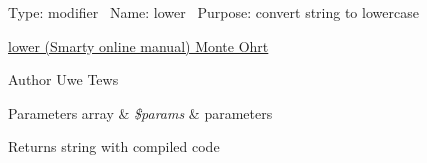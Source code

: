 Type\+: modifier~\newline
 Name\+: lower~\newline
 Purpose\+: convert string to lowercase

\hyperlink{}{lower (Smarty online manual)  Monte Ohrt } \begin{DoxyAuthor}{Author}
Uwe Tews 
\end{DoxyAuthor}

\begin{DoxyParams}[1]{Parameters}
array & {\em \$params} & parameters \\
\hline
\end{DoxyParams}
\begin{DoxyReturn}{Returns}
string with compiled code 
\end{DoxyReturn}
